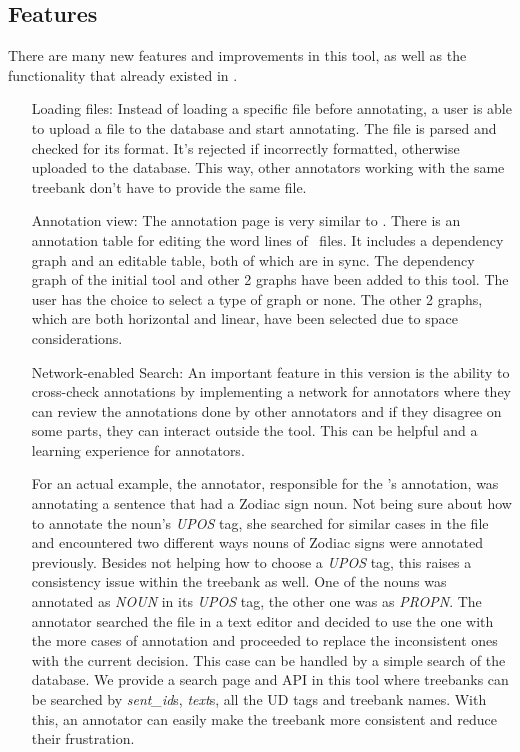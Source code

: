 \subsection{Features}
\label{sec:features}

There are many new features and improvements in this tool, as well as the functionality that already existed in \boatvone.

\begin{itemize}[before=\normalfont, font=\itshape, align=left]
\item[Loading files:] Instead of loading a specific file before annotating, a user is able to upload a \conllu{} file to the database and start annotating.
The file is parsed and checked for its format. It's rejected if incorrectly formatted, otherwise uploaded to the database.
This way, other annotators working with the same treebank don't have to provide the same file.

\item[Annotation view:] The annotation page is very similar to \boatvone.
There is an annotation table for editing the word lines of \conllu\ files.
It includes a dependency graph and an editable table, both of which are in sync.
The dependency graph of the initial tool and other 2 graphs have been added to this tool.
The user has the choice to select a type of graph or none.
The other 2 graphs, which are both horizontal and linear, have been selected due to space considerations.

\item[Network-enabled Search:] An important feature in this version is the ability to cross-check annotations by implementing a network for annotators where they can review the annotations done by other annotators and if they disagree on some parts, they can interact outside the tool.
This can be helpful and a learning experience for annotators.

For an actual example, the annotator, responsible for the \bountreebank{}'s annotation, was annotating a sentence that had a Zodiac sign noun.
Not being sure about how to annotate the noun's \textit{UPOS} tag, she searched for similar cases in the \conllu{} file and encountered two different ways nouns of Zodiac signs were annotated previously.
Besides not helping how to choose a \textit{UPOS} tag, this raises a consistency issue within the treebank as well.
One of the nouns was annotated as \textit{NOUN} in its \textit{UPOS} tag, the other one was as \textit{PROPN}.
The annotator searched the \conllu{} file in a text editor and decided to use the one with the more cases of annotation and proceeded to replace the inconsistent ones with the current decision.
This case can be handled by a simple search of the database.
We provide a search page and API in this tool where treebanks can be searched by \textit{sent\_id}s, \textit{text}s, all the UD tags and treebank names.
With this, an annotator can easily make the treebank more consistent and reduce their frustration.


\end{itemize}
